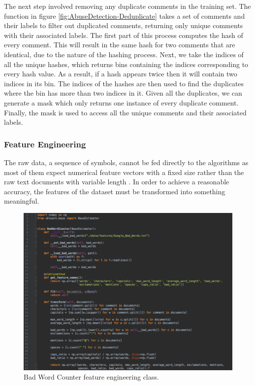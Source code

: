 The next step involved removing any duplicate comments in the training set. The function in figure \ref{fig:AbuseDetection-Deduplicate} takes a set of comments and their labels to filter out duplicated comments, returning only unique comments with their associated labels. The first part of this process computes the hash of every comment. This will result in the same hash for two comments that are identical, due to the nature of the hashing process. Next, we take the indices of all the unique hashes, which returns bins containing the indices corresponding to every hash value. As a result, if a hash appears twice then it will contain two indices in its bin. The indices of the hashes are then used to find the duplicates where the bin has more than two indices in it. Given all the duplicates, we can generate a mask which only returns one instance of every duplicate comment. Finally, the mask is used to access all the unique comments and their associated labels.

\subsubsection{Feature Engineering} \label{sec:feature-engineering}
The raw data, a sequence of symbols, cannot be fed directly to the algorithms as most of them expect numerical feature vectors with a fixed size rather than the raw text documents with variable length \cite{scikit:tfidf}. In order to achieve a reasonable accuracy, the features of the dataset must be transformed into something meaningful.

\begin{figure}[H]
    \centering
    \includegraphics[width=\textwidth]{Images/Implementation/DataProcessing/AbuseDetection/BadWordCounter}
    \caption{Bad Word Counter feature engineering class.}
    \label{fig:AbuseDetection-BadWordCounter}
\end{figure}

